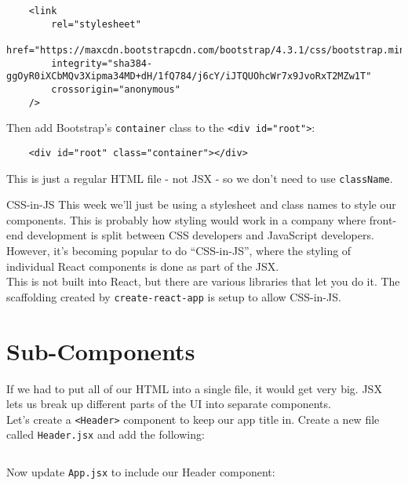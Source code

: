 \begin{verbatim}
    <link
        rel="stylesheet"
        href="https://maxcdn.bootstrapcdn.com/bootstrap/4.3.1/css/bootstrap.min.css"
        integrity="sha384-ggOyR0iXCbMQv3Xipma34MD+dH/1fQ784/j6cY/iJTQUOhcWr7x9JvoRxT2MZw1T"
        crossorigin="anonymous"
    />
\end{verbatim}

Then add Bootstrap's \texttt{container} class to the \texttt{<div id="root">}:

\begin{verbatim}
    <div id="root" class="container"></div>
\end{verbatim}

This is just a regular HTML file - not JSX - so we don't need to use \texttt{className}.


\begin{infobox}{CSS-in-JS}
    This week we'll just be using a stylesheet and class names to style our components. This is probably how styling would work in a company where front-end development is split between CSS developers and JavaScript developers.
    \\

    However, it's becoming popular to do ``CSS-in-JS'', where the styling of individual React components is done as part of the JSX.
    \\

    This is not built into React, but there are various libraries that let you do it. The scaffolding created by \texttt{create-react-app} is setup to allow CSS-in-JS.
\end{infobox}


\pagebreak


\section{Sub-Components}

If we had to put all of our HTML into a single file, it would get very big. JSX lets us break up different parts of the UI into separate components.
\\

Let's create a \texttt{<Header>} component to keep our app title in. Create a new file called \texttt{Header.jsx} and add the following:

\inputminted{jsx}{01/figures/02/03-Header.jsx}

Now update \texttt{App.jsx} to include our Header component:


